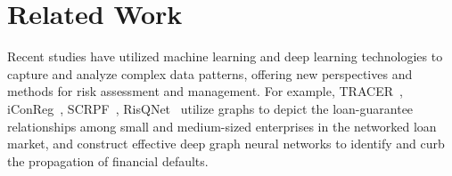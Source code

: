 \section{Related Work}


Recent studies have utilized machine learning and deep learning technologies to capture and analyze complex data patterns, offering new perspectives and methods for risk assessment and management. 
% 
For example, TRACER~\cite{cheng2020contagious}, iConReg~\cite{cheng2022regulating}, SCRPF~\cite{cheng2023critical}, RisQNet~\cite{ijcai2024p817}
utilize graphs to depict the loan-guarantee relationships among small and medium-sized enterprises in the networked loan market, and construct effective deep graph neural networks to identify and curb the propagation of financial defaults.


